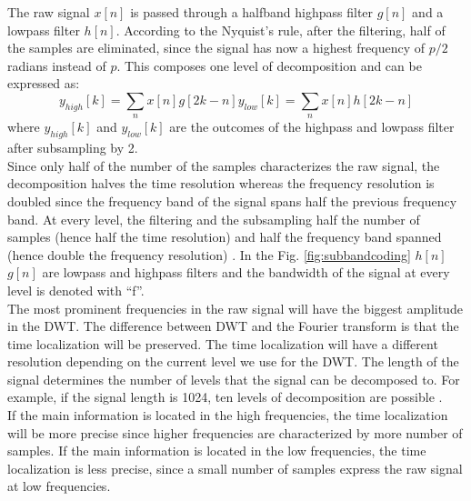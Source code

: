 The raw signal $x[n]$ is passed through a halfband highpass filter $g[n]$ and a lowpass filter $h[n]$. According to the Nyquist's rule, after the filtering, half of the samples are eliminated, since the signal has now a highest frequency of $p/2$ radians instead of $p$. This composes one level of decomposition and can be expressed as:
\begin{equation*}
y_{high}[k] = \sum_n x[n]g[2k - n]
y_{low}[k] = \sum_n x[n]h[2k - n]
\end{equation*}
where $y_{high}[k]$ and $y_{low}[k]$ are the outcomes of the highpass and lowpass filter after subsampling by 2.\\
Since only half of the number of the samples characterizes the raw signal, the decomposition halves the time resolution whereas the frequency resolution is doubled since the frequency band of the signal spans half the previous frequency band. At every level, the filtering and the subsampling half the number of samples (hence half the time resolution) and half the frequency band spanned (hence double the frequency resolution) \cite{polikar_wavelet_1996}. In the Fig. \ref{fig:subbandcoding} $h[n]$ $g[n]$ are lowpass and highpass filters and the bandwidth of the signal at every level is denoted with ``f''.\\
The most prominent frequencies in the raw signal will have the biggest amplitude in the DWT. The difference between DWT and the Fourier transform is that the time localization will be preserved. The time localization will have a different resolution depending on the current level we use for the DWT. The length of the signal determines the number of levels that the signal can be decomposed to. For example, if the signal length is 1024, ten levels of decomposition are possible \cite{polikar_wavelet_1996}. \\
If the main information is located in the high frequencies, the time localization will be more precise since higher frequencies are characterized by more number of samples. If the main information is located in the low frequencies, the time localization is less precise, since a small number of samples express the raw signal at low frequencies.\\
